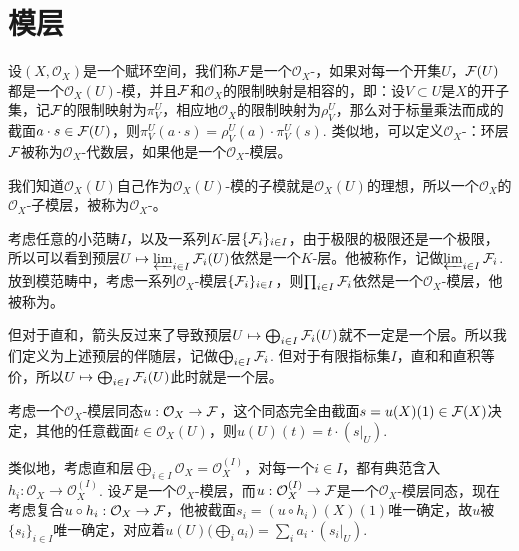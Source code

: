 \section{模层}

\begin{para}[模层]
设$(X,\mathcal{O}_X)$是一个赋环空间，我们称$\mathcal{F}$是一个$\mathcal{O}_X$-，如果对每一个开集$U$，$\mathcal{F}(U)$都是一个$\mathcal{O}_X(U)$-模，并且$\mathcal{F}$和$\mathcal{O}_X$的限制映射是相容的，即：设$V\subset U$是$X$的开子集，记$\mathcal{F}$的限制映射为$\pi^U_V$，相应地$\mathcal{O}_X$的限制映射为$\rho^U_V$，那么对于标量乘法而成的截面$a\cdot s\in\mathcal{F}(U)$，则$\pi^U_V(a\cdot s)=\rho^U_V(a)\cdot \pi^U_V(s)$. 类似地，可以定义$\mathcal{O}_X$-：环层$\mathcal{F}$被称为$\mathcal{O}_X$-代数层，如果他是一个$\mathcal{O}_X$-模层。
\end{para}

我们知道$\mathcal{O}_X(U)$自己作为$\mathcal{O}_X(U)$-模的子模就是$\mathcal{O}_X(U)$的理想，所以一个$\mathcal{O}_X$的$\mathcal{O}_X$-子模层，被称为$\mathcal{O}_X$-。

\para 考虑任意的小范畴$I$，以及一系列$K$-层$\{\mathcal{F}_i\}_{i\in I}$，由于极限的极限还是一个极限，所以可以看到预层$U\mapsto \varprojlim_{i\in I}\mathcal{F}_i(U)$依然是一个$K$-层。他被称作，记做$\varprojlim_{i\in I}\mathcal{F}_i$. 放到模范畴中，考虑一系列$\mathcal{O}_X$-模层$\{\mathcal{F}_i\}_{i\in I}$，则$\prod_{i\in I}\mathcal{F}_i$依然是一个$\mathcal{O}_X$-模层，他被称为。

但对于直和，箭头反过来了导致预层$U\mapsto \bigoplus_{i\in I}\mathcal{F}_i(U)$就不一定是一个层。所以我们定义为上述预层的伴随层，记做$\bigoplus_{i\in I}\mathcal{F}_i$. 但对于有限指标集$I$，直和和直积等价，所以$U\mapsto \bigoplus_{i\in I}\mathcal{F}_i(U)$此时就是一个层。

\begin{para}
考虑一个$\mathcal{O}_X$-模层同态$u:\mathcal{O}_X\to \mathcal{F}$，这个同态完全由截面$s=u(X)(1)\in \mathcal{F}(X)$决定，其他的任意截面$t\in \mathcal{O}_X(U)$，则$u(U)(t)=t\cdot (s|_U)$.

类似地，考虑直和层$\bigoplus_{i\in I}\mathcal{O}_X=\mathcal{O}_X^{(I)}$，对每一个$i\in I$，都有典范含入$h_i:\mathcal{O}_X\to \mathcal{O}_X^{(I)}$. 设$\mathcal{F}$是一个$\mathcal{O}_X$-模层，而$u:\mathcal{O}_X^{(I)}\to \mathcal{F}$是一个$\mathcal{O}_X$-模层同态，现在考虑复合$u\circ h_i:\mathcal{O}_X\to \mathcal{F}$，他被截面$s_i=(u\circ h_i)(X)(1)$唯一确定，故$u$被$\{s_i\}_{i\in I}$唯一确定，对应着$u(U)\bigl(\bigoplus_i a_i\bigr)=\sum_i a_i\cdot (s_i|_U)$.
\end{para}

